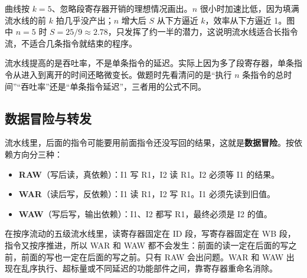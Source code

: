 \begin{center}
\end{center}

曲线按 $k=5$、忽略段寄存器开销的理想情况画出。$n$ 很小时加速比低，因为填满流水线的前 $k$ 拍几乎没产出；$n$ 增大后 $S$ 从下方逼近 $k$，效率从下方逼近 1。图中 $n=5$ 时 $S=25/9\approx2.78$，只发挥了约一半的潜力，这说明流水线适合长指令流，不适合几条指令就结束的程序。

\begin{attention}
流水线提高的是吞吐率，不是单条指令的延迟。实际上因为多了段寄存器，单条指令从进入到离开的时间还略微变长。做题时先看清问的是“执行 $n$ 条指令的总时间”“吞吐率”还是“单条指令延迟”，三者用的公式不同。
\end{attention}

\subsection{数据冒险与转发}

流水线里，后面的指令可能要用前面指令还没写回的结果，这就是\textbf{数据冒险}。按依赖方向分三种：

\begin{itemize}
  \item \textbf{RAW}（写后读，真依赖）：I1 写 R1，I2 读 R1。I2 必须等 I1 的结果。
  \item \textbf{WAR}（读后写，反依赖）：I1 读 R1，I2 写 R1。I1 必须先读到旧值。
  \item \textbf{WAW}（写后写，输出依赖）：I1、I2 都写 R1，最终必须是 I2 的值。
\end{itemize}

在按序流动的五级流水线里，读寄存器固定在 ID 段，写寄存器固定在 WB 段，指令又按序推进，所以 WAR 和 WAW 都不会发生：前面的读一定在后面的写之前，前面的写也一定在后面的写之前。只有 RAW 会出问题。WAR 和 WAW 出现在乱序执行、超标量或不同延迟的功能部件之间，靠寄存器重命名消除。


